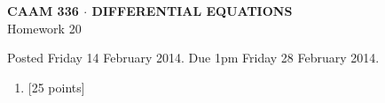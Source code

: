 \documentclass[10pt]{article}
\begin{document}
\vspace*{-5em}
\begin{center}
\large \textsf{\textbf{CAAM 336 $\cdot$ DIFFERENTIAL EQUATIONS}\\[0.5em]
Homework 20 }
\end{center}

Posted Friday 14 February 2014.  Due 1pm Friday 28 February 2014.

\begin{enumerate}\addtocounter{enumi}{19}
\item {[25 points]}  
\end{enumerate}
\end{document}
